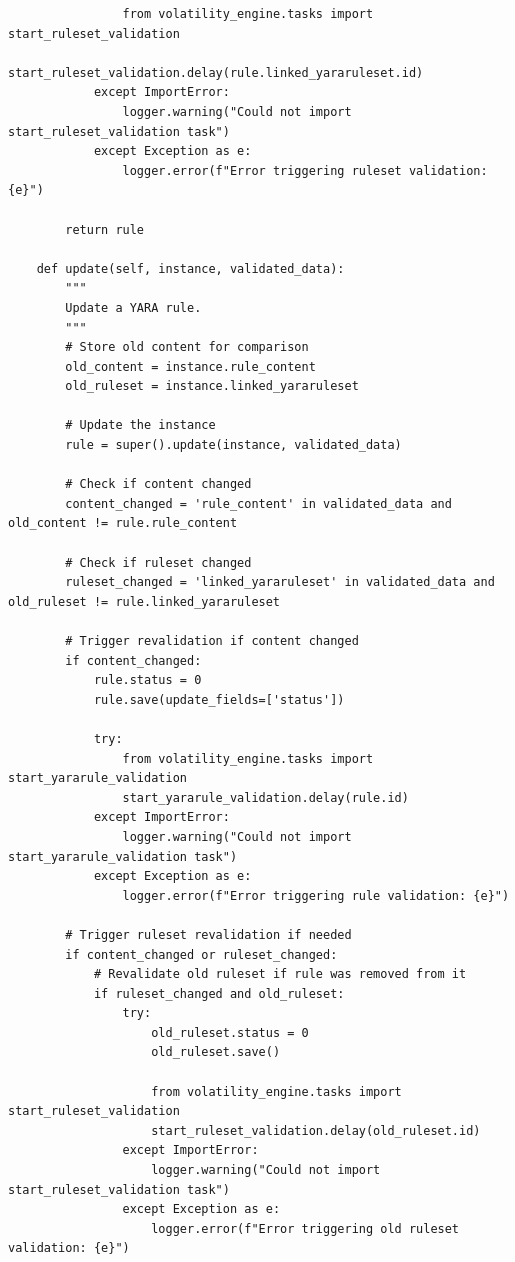 \begin{verbatim}
                from volatility_engine.tasks import start_ruleset_validation
                start_ruleset_validation.delay(rule.linked_yararuleset.id)
            except ImportError:
                logger.warning("Could not import start_ruleset_validation task")
            except Exception as e:
                logger.error(f"Error triggering ruleset validation: {e}")
        
        return rule
    
    def update(self, instance, validated_data):
        """
        Update a YARA rule.
        """
        # Store old content for comparison
        old_content = instance.rule_content
        old_ruleset = instance.linked_yararuleset
        
        # Update the instance
        rule = super().update(instance, validated_data)
        
        # Check if content changed
        content_changed = 'rule_content' in validated_data and old_content != rule.rule_content
        
        # Check if ruleset changed
        ruleset_changed = 'linked_yararuleset' in validated_data and old_ruleset != rule.linked_yararuleset
        
        # Trigger revalidation if content changed
        if content_changed:
            rule.status = 0
            rule.save(update_fields=['status'])
            
            try:
                from volatility_engine.tasks import start_yararule_validation
                start_yararule_validation.delay(rule.id)
            except ImportError:
                logger.warning("Could not import start_yararule_validation task")
            except Exception as e:
                logger.error(f"Error triggering rule validation: {e}")
        
        # Trigger ruleset revalidation if needed
        if content_changed or ruleset_changed:
            # Revalidate old ruleset if rule was removed from it
            if ruleset_changed and old_ruleset:
                try:
                    old_ruleset.status = 0
                    old_ruleset.save()
                    
                    from volatility_engine.tasks import start_ruleset_validation
                    start_ruleset_validation.delay(old_ruleset.id)
                except ImportError:
                    logger.warning("Could not import start_ruleset_validation task")
                except Exception as e:
                    logger.error(f"Error triggering old ruleset validation: {e}")
            

\end{verbatim}
